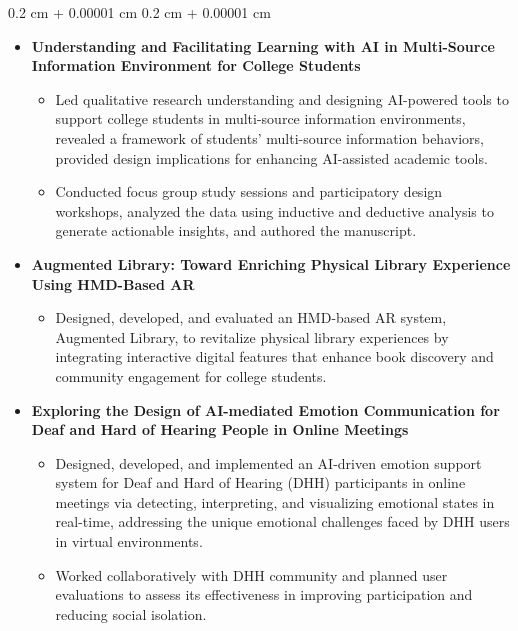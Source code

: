 \documentclass[10pt, letterpaper]{article}
\newenvironment{highlights}{
    \begin{itemize}[
        topsep=0.10 cm,
        parsep=0.10 cm,
        partopsep=0pt,
        itemsep=0pt,
        leftmargin=0.4 cm + 10pt
    ]
}{
    \end{itemize}
} %
\newenvironment{onecolentry}{
    \begin{adjustwidth}{
        0.2 cm + 0.00001 cm
    }{
        0.2 cm + 0.00001 cm
    }
}{
    \end{adjustwidth}
} %
\begin{document}
        \vspace{0.10 cm}
        \begin{onecolentry}
            \begin{highlights}
                \item \textbf{Understanding and Facilitating Learning with AI in Multi-Source Information Environment for College Students}
                \begin{itemize}
                    \item Led qualitative research understanding and designing AI-powered tools to support college students in multi-source information environments, revealed a framework of students' multi-source information behaviors, provided design implications for enhancing AI-assisted academic tools.
                    \item Conducted focus group study sessions and participatory design workshops, analyzed the data using inductive and deductive analysis to generate actionable insights, and authored the manuscript.
                \end{itemize}
                \item \textbf{Augmented Library: Toward Enriching Physical Library Experience Using HMD-Based AR}
                \begin{itemize}
                    \item Designed, developed, and evaluated an HMD-based AR system, Augmented Library, to revitalize physical library experiences by integrating interactive digital features that enhance book discovery and community engagement for college students.
                \end{itemize}
                \item \textbf{Exploring the Design of AI-mediated Emotion Communication for Deaf and Hard of Hearing People in Online Meetings}
                \begin{itemize}
                    \item Designed, developed, and implemented an AI-driven emotion support system for Deaf and Hard of Hearing (DHH) participants in online meetings via detecting, interpreting, and visualizing emotional states in real-time, addressing the unique emotional challenges faced by DHH users in virtual environments.
                    \item Worked collaboratively with DHH community and planned user evaluations to assess its effectiveness in improving participation and reducing social isolation.
                \end{itemize}

\end{highlights}
\end{onecolentry}
\end{document}
